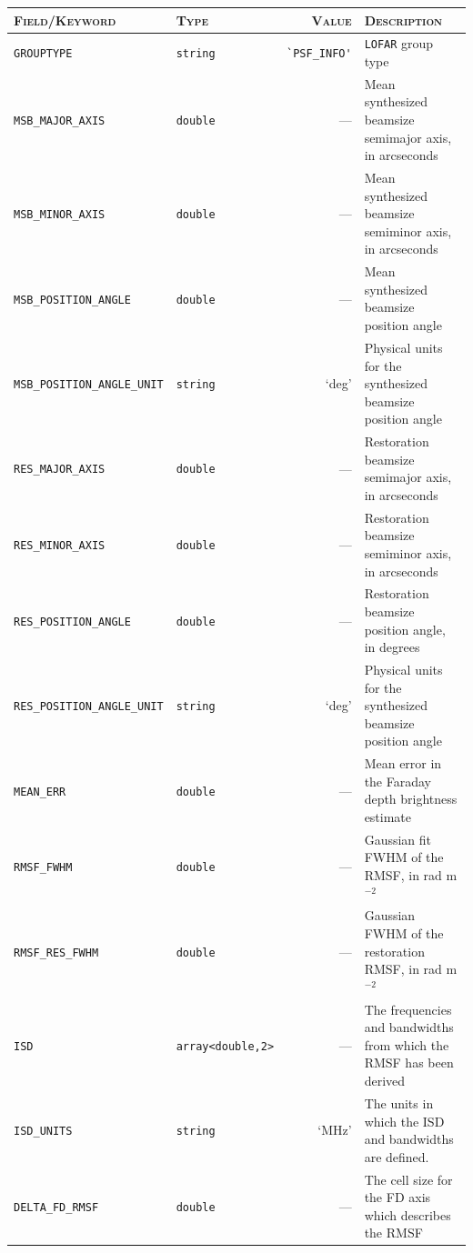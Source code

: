 \documentclass[a4paper,10pt,bibtotoc]{scrartcl}
\begin{document}
\begin{table}[htbp]
  \centering
  \begin{tabular}{|llrp{6.5cm}|}
    \hline 
    \textsc{Field/Keyword} & \textsc{Type} & \textsc{Value} & \textsc{Description} \\
    \hline \hline 
    \small\verb|GROUPTYPE|       & \small\verb|string| & \small{\verb|`PSF_INFO'|} & \small{\verb|LOFAR|} group type \\
    \small\verb|MSB_MAJOR_AXIS|   & \small\verb|double| & --- & Mean synthesized beamsize semimajor axis, in arcseconds \\
    \small\verb|MSB_MINOR_AXIS|   & \small\verb|double| & --- & Mean synthesized beamsize semiminor axis, in arcseconds \\
    \small\verb|MSB_POSITION_ANGLE| & \small\verb|double| & --- & Mean synthesized beamsize position angle \\
    \small\verb|MSB_POSITION_ANGLE_UNIT| & \small\verb|string| & `deg' & Physical units for the synthesized beamsize position angle \\
    \small{\verb|RES_MAJOR_AXIS|}   & \small\verb|double| & --- & Restoration beamsize semimajor axis, in arcseconds \\
    \small{\verb|RES_MINOR_AXIS|}   & \small\verb|double| & --- & Restoration beamsize semiminor axis, in arcseconds \\
    \small{\verb|RES_POSITION_ANGLE|} & \small\verb|double| & --- & Restoration beamsize position angle, in degrees \\
    \small{\verb|RES_POSITION_ANGLE_UNIT|} & \small\verb|string| & `deg' & Physical units for the synthesized beamsize position angle \\
    \small{\verb|MEAN_ERR|}        & \small\verb|double| & --- & Mean error in the Faraday depth brightness estimate \\
    \small{\verb|RMSF_FWHM|}      & \small\verb|double| & --- & Gaussian fit FWHM of the RMSF, in rad m$^{-2}$ \\
    \small{\verb|RMSF_RES_FWHM|}   & \small\verb|double| & --- & Gaussian FWHM of the restoration RMSF, in rad m$^{-2}$ \\
    \small{\verb|ISD|}  & \small{\verb|array<double,2>|} & --- & The frequencies and bandwidths from which the RMSF has been derived\\
    \small{\verb|ISD_UNITS|} & \small\verb|string| & `MHz' & The units in which the ISD and bandwidths are defined.\\
    \hline
    \small{\verb|DELTA_FD_RMSF|} & \small\verb|double| & --- & The cell size for the FD axis which describes the RMSF \\

\end{tabular}
\end{table}
\end{document}
